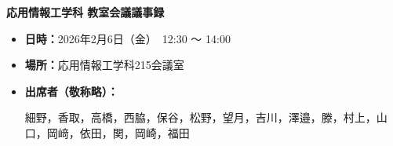 \documentclass[10.5pt,a4paper]{jsarticle}
\begin{document}
\begin{center}
\fontsize{12pt}{12pt}\bf{応用情報工学科 教室会議議事録}
\end{center}
\vspace{1\baselineskip}

%

\begin{itemize}[labelsep=0.5zw, leftmargin=1zw, itemindent=0pt, labelwidth=0pt, listparindent=0pt, parsep=0pt]
    \item[①] \textbf{日時：}2026年2月6日（金）　12:30 ～ 14:00
    \item[②] \textbf{場所：}応用情報工学科215会議室
    \item[③] \textbf{出席者（敬称略）：}%
    \parbox[t]{0.8\textwidth}{
        細野，香取，高橋，西脇，保谷，松野，望月，吉川，澤邉，滕，村上，山口，岡﨑，依田，関，岡崎，福田
    }
\end{itemize}


\vspace{0.1\baselineskip}
\end{document}
